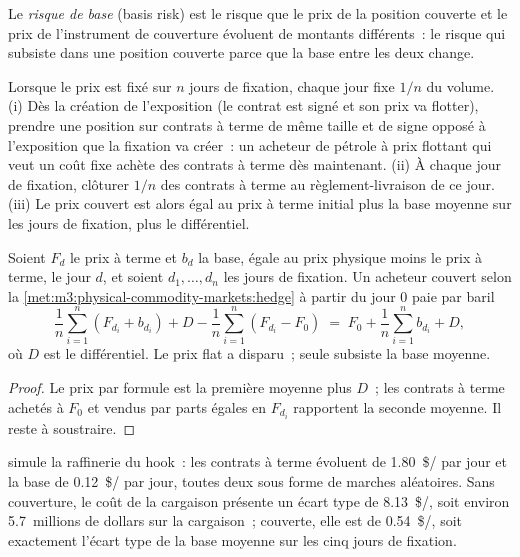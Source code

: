 \begin{definition}\label{def:m3:physical-commodity-markets:basisrisk}
Le \emph{risque de base} (basis risk) est le risque que le prix de la position
couverte et le prix de l'instrument de couverture évoluent de montants différents~: le
risque qui subsiste dans une position couverte parce que la base entre les deux change.
\end{definition}

\begin{method}\label{met:m3:physical-commodity-markets:hedge}
Lorsque le prix est fixé sur $n$ jours de fixation, chaque jour fixe $1/n$ du volume.
(i) Dès la création de l'exposition (le contrat est signé et son prix va
flotter), prendre une position sur contrats à terme de même taille et de signe opposé à
l'exposition que la fixation va créer~: un acheteur de pétrole à prix flottant qui veut un coût fixe achète
des contrats à terme dès maintenant. (ii) À chaque jour de fixation, clôturer $1/n$ des contrats à terme
au règlement-livraison de ce jour. (iii) Le prix couvert est alors égal au prix à terme initial plus la
base moyenne sur les jours de fixation, plus le différentiel.
\end{method}

\begin{proposition}\label{prop:m3:physical-commodity-markets:hedged}
Soient $F_d$ le prix à terme et $b_d$ la base, égale au prix physique moins le prix à terme, le
jour $d$, et soient $d_1,\dots,d_n$ les jours de fixation. Un acheteur couvert selon
la \cref{met:m3:physical-commodity-markets:hedge} à partir du jour $0$ paie par baril
\[
\frac1n\sum_{i=1}^n (F_{d_i}+b_{d_i}) + D - \frac1n\sum_{i=1}^n (F_{d_i}-F_0)
\;=\; F_0 + \frac1n\sum_{i=1}^n b_{d_i} + D ,
\]
où $D$ est le différentiel. Le prix flat a disparu~; seule subsiste la base moyenne.
\end{proposition}

\begin{proof}
Le prix par formule est la première moyenne plus $D$~; les contrats à terme achetés à $F_0$ et
vendus par parts égales en $F_{d_i}$ rapportent la seconde moyenne. Il reste à soustraire.
\end{proof}

 simule la raffinerie du
hook~: les contrats à terme évoluent de \qty{1.80}{\$/\barrel} par jour et la base de
\qty{0.12}{\$/\barrel} par jour, toutes deux sous forme de marches aléatoires. Sans couverture, le coût de la
cargaison présente un écart type de \qty{8.13}{\$/\barrel}, soit environ 5.7~millions de dollars sur
la cargaison~; couverte, elle est de \qty{0.54}{\$/\barrel}, soit exactement l'écart type
de la base moyenne sur les cinq jours de fixation.


